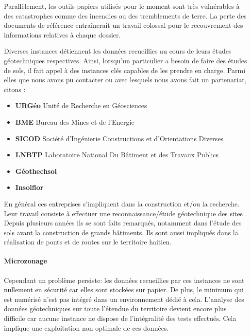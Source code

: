 \par
Parallèlement, les outils papiers utilisés pour le moment sont très vulnérables à des
catastrophes comme des incendies ou des tremblements de terre. La perte 
des documents de référence entraînerait un travail
colossal pour le recouvrement des informations relatives à chaque 
dossier.
\par
Diverses instances détiennent les données recueillies au cours
de leurs études géotechniques respectives. 
Ainsi, lorsqu’un particulier a besoin de faire des études de sols, il 
fait appel à des instances clés capables de les prendre en charge. 
Parmi elles que nous avons pu contacter ou avec lesquels nous avons fait un partenariat, citons :
\begin{itemize}
    \item \textbf{URGéo}
    Unité de Recherche en Géosciences \cite{linkurgeo} 
    \item \textbf{BME}
    Bureau des Mines et de l’Energie \cite{linkbme} 
    \item \textbf{SICOD}
    Société d’Ingénierie Constructions et d’Orientations Diverses
    \item \textbf{LNBTP}
    Laboratoire National Du Bâtiment et des Travaux Publics \cite{linklnbtp} 
    \item \textbf{Géothechsol} \cite{linkgeotechsol} 
    \item \textbf{Insolflor} 
\end{itemize}   

\par
En général ces entreprises s'impliquent dans la construction et/ou la recherche. 
Leur travail consiste à effectuer une reconnaissance/étude géotechnique des sites .
Depuis plusieurs années ils se sont faits remarqués, notamment dans
l'étude des sols avant la construction de grands bâtiments. Ils sont aussi impliqués
dans la réalisation de ponts et de routes sur le territoire
haitien.
\paragraph{Microzonage}
\paragraph{}


\paragraph{}
Cependant un problème persiste: les données recueillies par ces instances
ne sont nullement en sécurité car elles sont stockées sur papier.
De plus, le minimum qui est numérisé n'est pas intégré dans un environnement 
dédié à cela.
L'analyse des données géotechniques sur toute l'étendue du territoire devient
encore plus difficile car aucune instance ne dispose de l'intégralité des tests effectués.
Cela implique une exploitation non optimale de ces données.
